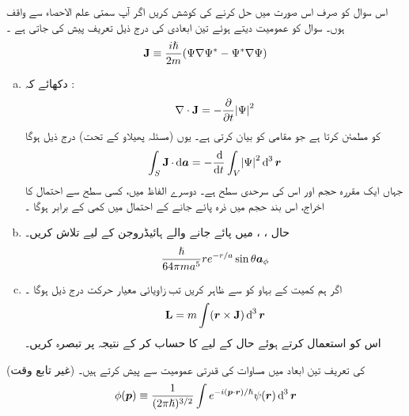 اس سوال کو صرف اس صورت میں حل کرنے کی کوشش کریں اگر آپ سمتی علم الاحصاء سے واقف ہوں۔  سوال   کو عمومیت  دیتے ہوئے  تین  ابعادی  کی درج ذیل  تعریف پیش  کی جاتی ہے ۔
\begin{align}
\operatorname{\mathbf{J}} \equiv \frac{i \hslash}{2 m} (\Psi \nabla \Psi^* - \Psi^* \nabla \Psi)
\end{align}
\begin{enumerate}[a.]
\item
دکھائے کہ  : 
\begin{align}
\nabla \cdot \operatorname{\mathbf{J}} = - \frac{\partial}{\partial t} \abs{\Psi}^2
\end{align}
کو مطمئن کرتا ہے  جو مقامی   کو بیان کرتی ہے۔  یوں  (مسئلہ  پھیلاو  کے تحت)  درج ذیل ہوگا 
\begin{align}
\int_S \mat{J} \cdot \dif \kvec{a} = - \frac{\dif}{\dif t} \int_V \abs{\Psi}^2 \dif^{\,3} \kvec{r}
\end{align}
جہاں  ایک مقررہ حجم اور  اس کی سرحدی سطح ہے۔ دوسرے  الفاظ میں،  کسی سطح سے احتمال کا اخراج،  اس بند حجم میں ذرہ پائے جانے کے  احتمال میں کمی کے برابر ہوگا ۔
\item
حال ،   ،  میں پائے جانے والے ہائیڈروجن کے لیے   تلاش کریں۔  
\begin{align*}
\frac{\hslash}{64 \pi m a^5} r e^{- r/a} \sin \theta {\boldsymbol{a}}_{\phi}
\end{align*}
\item
اگر ہم کمیت کے  بہاو  کو  سے ظاہر کریں تب زاویائی معیار حرکت درج ذیل ہوگا ۔
\begin{align*}
\mat{L} = m \int (\kvec{r} \times \mat{J}) \dif^{\,3} \kvec{r}
\end{align*}
اس کو استعمال کرتے ہوئے حال  کے لیے  کا حساب  کر کے  نتیجہ پر تبصرہ کریں۔ 
\end{enumerate}
(غیر تابع وقت)  کی تعریف   تین  ابعاد میں مساوات  کی قدرتی عمومیت    سے پیش کرتے ہیں۔ 
\begin{align}
\phi (\kvec{p}) \equiv \frac{1}{(2 \pi \hslash)^{3/2}} \int e^{- i(\kvec{p} \cdot \kvec{r})/\hslash} \psi (\kvec{r}) \dif^{\,3} \kvec{r}
\end{align}
